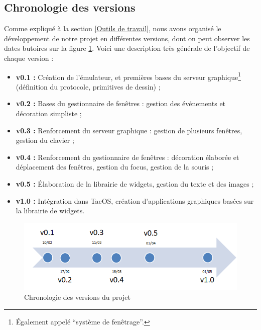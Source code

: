 \subsection{Chronologie des versions}
\label{chrono}
Comme expliqué à la section \ref{Outils de travail}, nous avons organisé le développement de notre projet en différentes versions, dont on peut observer les dates butoires sur la figure \ref{fig:chrono}. Voici une description très générale de l'objectif de chaque version :
\begin{itemize}
\renewcommand{\labelitemi}{$\bullet$}
\item \textbf{v0.1 :} Création de l'émulateur, et premières bases du serveur graphique\footnote{Également appelé ``système de fenêtrage''.} (définition du protocole, primitives de dessin) ;
\item \textbf{v0.2 :} Bases du gestionnaire de fenêtres : gestion des événements et décoration simpliste ;
\item \textbf{v0.3 :} Renforcement du serveur graphique : gestion de plusieurs fenêtres, gestion du clavier ;
\item \textbf{v0.4 :} Renforcement du gestionnaire de fenêtres : décoration élaborée et déplacement des fenêtres, gestion du focus, gestion de la souris ;
\item \textbf{v0.5 :} Élaboration de la librairie de widgets, gestion du texte et des images ;
\item \textbf{v1.0 :} Intégration dans TacOS, création d'applications graphiques basées sur la librairie de widgets.
\end{itemize}

\begin{figure}[H]
  \centering
    \includegraphics[width=15cm]{figures/chrono}
  \caption{\label{fig:chrono}Chronologie des versions du projet}
\end{figure}

